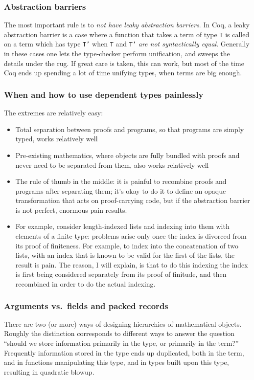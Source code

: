 \documentclass[twoside]{article}
\begin{document}
{\subsubsection{Abstraction barriers}
The most important rule is to \emph{not have leaky abstraction barriers}.
In Coq, a leaky abstraction barrier is a case where a function that takes a term of type \texttt{T} is called on a term which has type \texttt{T'} when \texttt{T} and \texttt{T'} \emph{are not syntactically equal}.
Generally in these cases one lets the type-checker perform unification, and sweeps the details under the rug.
If great care is taken, this can work, but most of the time Coq ends up spending a lot of time unifying types, when terms are big enough.

\subsubsection{When and how to use dependent types painlessly}
The extremes are relatively easy:
\begin{itemize}
\item Total separation between proofs and programs, so that programs are simply typed, works relatively well
\item Pre-existing mathematics, where objects are fully bundled with proofs and never need to be separated from them, also works relatively well
\item The rule of thumb in the middle: it is painful to recombine proofs and programs after separating them; it's okay to do it to define an opaque transformation that acts on proof-carrying code, but if the abstraction barrier is not perfect, enormous pain results.
\item For example, consider length-indexed lists and indexing into them with elements of a finite type: problems arise only once the index is divorced from its proof of finiteness.  For example, to index into the concatenation of two lists, with an index that is known to be valid for the first of the lists, the result is pain.  The reason, I will explain, is that to do this indexing the index is first being considered separately from its proof of finitude, and then recombined in order to do the actual indexing.
\end{itemize}

\subsubsection{Arguments vs.~fields and packed records}
There are two (or more) ways of designing hierarchies of mathematical objects.
Roughly the distinction corresponds to different ways to answer the question ``should we store information primarily in the type, or primarily in the term?''
Frequently information stored in the type ends up duplicated, both in the term, and in functions manipulating this type, and in types built upon this type, resulting in quadratic blowup.

}
\end{document}
